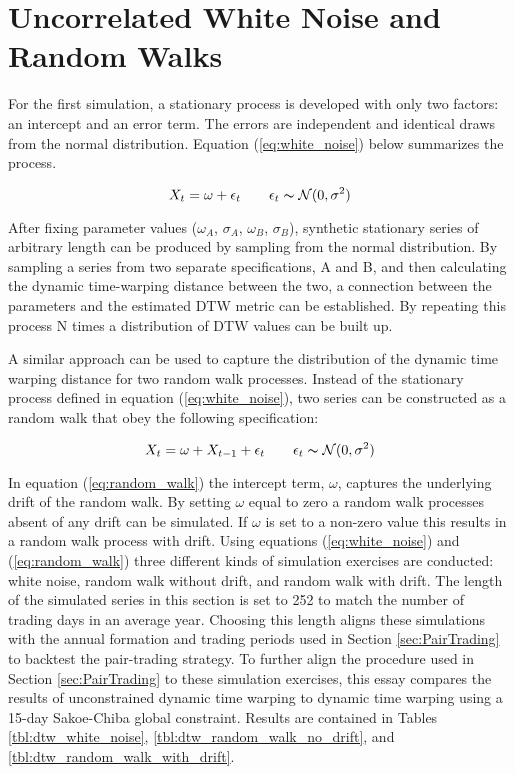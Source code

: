 \documentclass[12pt]{report}
\begin{document}
\section{Uncorrelated White Noise and Random Walks} \label{sec:Uncorrelated_white_noise}

For the first simulation, a stationary process is developed with only two factors: an intercept and an error term. The errors are independent and identical draws from the normal distribution. Equation (\ref{eq:white_noise}) below summarizes the process.

\begin{equation} \label{eq:white_noise}
    X_{t} = \omega + \epsilon_{t} \qquad \epsilon_{t} \thicksim \mathcal{N}(0, \sigma^{2})
\end{equation}

After fixing parameter values ($\omega_{A}$, $\sigma_{A}$, $\omega_{B}$, $\sigma_{B}$), synthetic stationary series of arbitrary length can be produced by sampling from the normal distribution. By sampling a series from two separate specifications, A and B, and then calculating the dynamic time-warping distance between the two, a connection between the parameters and the estimated DTW metric can be established. By repeating this process N times a distribution of DTW values can be built up.

A similar approach can be used to capture the distribution of the dynamic time warping distance for two random walk processes. Instead of the stationary process defined in equation (\ref{eq:white_noise}), two series can be constructed as a random walk that obey the following specification:

\begin{equation} \label{eq:random_walk}
    X_{t} = \omega + X_{t-1} + \epsilon_{t} \qquad \epsilon_{t} \thicksim \mathcal{N}(0, \sigma^{2})
\end{equation}

In equation (\ref{eq:random_walk}) the intercept term, $\omega$, captures the underlying drift of the random walk. By setting $\omega$ equal to zero a random walk processes absent of any drift can be simulated. If $\omega$ is set to a non-zero value this results in a random walk process with drift. Using equations (\ref{eq:white_noise}) and (\ref{eq:random_walk}) three different kinds of simulation exercises are conducted: white noise, random walk without drift, and random walk with drift. The length of the simulated series in this section is set to 252 to match the number of trading days in an average year. Choosing this length aligns these simulations with the annual formation and trading periods used in Section \ref{sec:PairTrading} to backtest the pair-trading strategy. To further align the procedure used in Section \ref{sec:PairTrading} to these simulation exercises, this essay compares the results of unconstrained dynamic time warping to dynamic time warping using a 15-day Sakoe-Chiba global constraint. Results are contained in Tables \ref{tbl:dtw_white_noise}, \ref{tbl:dtw_random_walk_no_drift}, and \ref{tbl:dtw_random_walk_with_drift}.
\end{document}
